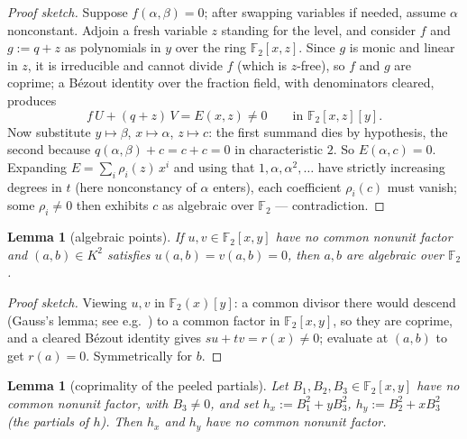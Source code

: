 \documentclass[11pt]{article}
\newtheorem{lemma}[theorem]{Lemma}
\theoremstyle{definition}
\theoremstyle{remark}
\newcommand{\F}{\mathbb{F}}
\begin{document}
\begin{proof}[Proof sketch]
Suppose $f(\alpha,\beta) = 0$; after swapping variables if needed,
assume $\alpha$ nonconstant.  Adjoin a fresh variable $z$ standing for
the level, and consider $f$ and $g := q + z$ as polynomials in $y$
over the ring $\F_2[x,z]$.  Since $g$ is monic and linear in $z$, it
is irreducible and cannot divide $f$ (which is $z$-free), so $f$ and
$g$ are coprime; a B\'ezout identity over the fraction field, with
denominators cleared, produces
\[
  f\,U + (q + z)\,V = E(x, z) \neq 0
  \qquad \text{in } \F_2[x,z][y].
\]
Now substitute $y \mapsto \beta$, $x \mapsto \alpha$, $z \mapsto c$:
the first summand dies by hypothesis, the second because
$q(\alpha,\beta) + c = c + c = 0$ in characteristic $2$.  So
$E(\alpha, c) = 0$.  Expanding $E = \sum_i \rho_i(z)\,x^i$ and using
that $1, \alpha, \alpha^2, \dots$ have strictly increasing degrees in
$t$ (here nonconstancy of $\alpha$ enters), each coefficient
$\rho_i(c)$ must vanish; some $\rho_i \neq 0$ then exhibits $c$ as
algebraic over $\F_2$ --- contradiction.
\end{proof}

\begin{lemma}[algebraic points]\label{lem:algpoint}
If $u, v \in \F_2[x,y]$ have no common nonunit factor and
$(a,b) \in K^2$ satisfies $u(a,b) = v(a,b) = 0$, then $a, b$ are
algebraic over $\F_2$.
\end{lemma}

\begin{proof}[Proof sketch]
Viewing $u, v$ in $\F_2(x)[y]$: a common divisor there would descend
(Gauss's lemma; see e.g.\ \cite[Ch.~IV]{Lang}) to a common factor in
$\F_2[x,y]$, so they are
coprime, and a cleared B\'ezout identity gives
$su + tv = r(x) \neq 0$; evaluate at $(a,b)$ to get $r(a) = 0$.
Symmetrically for $b$.
\end{proof}

\begin{lemma}[coprimality of the peeled
partials]\label{lem:keystone}
Let $B_1, B_2, B_3 \in \F_2[x,y]$ have no common nonunit factor, with
$B_3 \neq 0$, and set
$h_x := B_1^2 + y B_3^2$, $h_y := B_2^2 + x B_3^2$ (the partials of
$h$).  Then $h_x$ and $h_y$ have no common nonunit factor.
\end{lemma}
\end{document}
